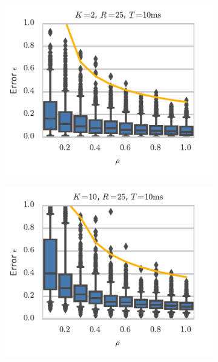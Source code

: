 \begin{figure}[t!]
\begin{subfigure}[b]{2.75in}
 \end{subfigure}
 \\
 \vspace{-.25in}
 \begin{subfigure}[b]{2.75in}
   \centering
   \includegraphics[width=\textwidth]{figures/ch7/error_vs_rho_K2}
   \label{fig:error_vs_rho_K2}
 \end{subfigure}
 \begin{subfigure}[b]{2.75in}
   \centering
   \includegraphics[width=\textwidth]{figures/ch7/error_vs_rho_K10}
   \label{fig:error_vs_rho_K10}

\end{subfigure}
\end{figure}
